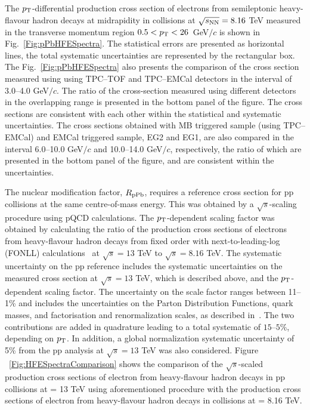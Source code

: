 
 The $p_{\rm{T}}$-differential production cross section of electrons from semileptonic heavy-flavour hadron decays at midrapidity in \pPb collisions at $\sqrt{s_{\rm{NN}}} = 8.16$ TeV measured in the transverse momentum region $0.5 < p_{\rm{T}} < 26$~GeV$/c$ is shown in Fig.~\ref{Fig:pPbHFESpectra}. The statistical errors are presented as horizontal lines, the total systematic uncertainties are represented by the rectangular box. The Fig.~\ref{Fig:pPbHFESpectra} also presents the comparison of the cross section measured using using TPC--TOF and TPC--EMCal detectors in the interval of 3.0--4.0 GeV$/c$. The ratio of the cross-section measured using different detectors in the overlapping \pt range is presented in the bottom panel of the figure. The cross sections are consistent with each other within the statistical and systematic uncertainties. The cross sections obtained with MB triggered sample (using TPC--EMCal) and EMCal triggered sample, EG2 and EG1, are also compared in the interval  6.0--10.0 GeV$/c$ and 10.0--14.0 GeV$/c$, respectively, the ratio of which are presented in the bottom panel of the figure, and are consistent within the uncertainties. 

The nuclear modification factor, $R_{\rm{pPb}}$, requires a reference cross section for pp collisions at the same centre-of-mass energy. This was obtained by a $\sqrt{s}$-scaling procedure using pQCD calculations. The $p_{\rm{T}}$-dependent scaling factor was obtained by calculating the ratio of the production cross sections of electrons from heavy-flavour hadron decays from fixed order with next-to-leading-log (FONLL) calculations~\cite{Cacciari:1998it,Cacciari:2001td, Cacciari:2012ny} at $\sqrt{s}=13$ TeV to $\sqrt{s}=8.16$ TeV. The systematic uncertainty on the pp reference includes the systematic uncertainties on the measured cross section at $\sqrt{s}=13$ TeV, which is described above, and the $p_{\rm{T}}$-dependent scaling factor. The uncertainty on the scale factor ranges between 11--1\% and includes the uncertainties on the Parton Distribution Functions, quark masses, and factorisation and renormalization scales, as described in~\cite{Averbeck:2011ga}. The two contributions are added in quadrature leading to a total systematic of  $15–5\%$, depending on $p_{\rm{T}}$. In addition, a global normalization systematic uncertainty of 5\% from the pp analysis at $\sqrt{s}=13$ TeV was also considered. Figure ~\ref{Fig:HFESpectraComparison} shows the comparison of the $\sqrt{s}$-scaled  production cross sections of electron from heavy-flavour hadron decays in pp collisions at \sqrts = 13 TeV using aforementioned procedure with the production cross sections of electron from heavy-flavour hadron decays in \pPb collisions at \sqrtsNN = 8.16 TeV.

